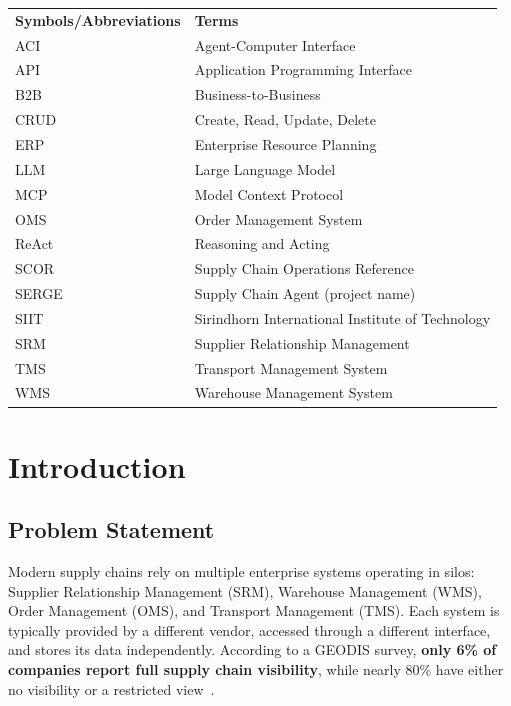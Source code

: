 \documentclass[12pt,a4paper]{report}
\begin{document}
\vspace{1em}

\begin{tabular}{@{} l l @{}}
\textbf{Symbols/Abbreviations} & \textbf{Terms} \\[0.5em]
ACI   & Agent-Computer Interface \\
API   & Application Programming Interface \\
B2B   & Business-to-Business \\
CRUD  & Create, Read, Update, Delete \\
ERP   & Enterprise Resource Planning \\
LLM   & Large Language Model \\
MCP   & Model Context Protocol \\
OMS   & Order Management System \\
ReAct & Reasoning and Acting \\
SCOR  & Supply Chain Operations Reference \\
SERGE & Supply Chain Agent (project name) \\
SIIT  & Sirindhorn International Institute of Technology \\
SRM   & Supplier Relationship Management \\
TMS   & Transport Management System \\
WMS   & Warehouse Management System \\
\end{tabular}

\newpage
{}

\chapter{Introduction}

\section{Problem Statement}

Modern supply chains rely on multiple enterprise systems operating in silos: Supplier Relationship Management (SRM), Warehouse Management (WMS), Order Management (OMS), and Transport Management (TMS). Each system is typically provided by a different vendor, accessed through a different interface, and stores its data independently. According to a GEODIS survey, \textbf{only 6\% of companies report full supply chain visibility}, while nearly 80\% have either no visibility or a restricted view~\cite{geodis2024}.
\end{document}
